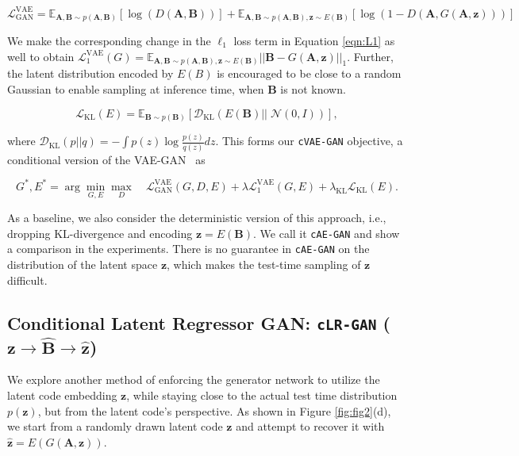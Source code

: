 \begin{equation}
\mathcal{L}_{\text{GAN}}^{\text{VAE}} = \mathds{E}_{\mathbf{A},\mathbf{B}\sim p(\mathbf{A},\mathbf{B})}[\log(D(\mathbf{A},\mathbf{B}))] + \mathds{E}_{\mathbf{A},\mathbf{B}\sim p(\mathbf{A},\mathbf{B}),\mathbf{z}\sim E(\mathbf{B})}[ \log(1-D(\mathbf{A},G(\mathbf{A},\mathbf{z})))]
\label{eqn:LVAE}
\end{equation}

We make the corresponding change in the $\ell_1$ loss term in Equation \ref{eqn:L1} as well to obtain $\mathcal{L}_1^{\text{VAE}}(G)=\mathds{E}_{\mathbf{A},\mathbf{B}\sim p(\mathbf{A},\mathbf{B}),\mathbf{z}\sim E(\mathbf{B})} ||\mathbf{B} - G(\mathbf{A},\mathbf{z}) ||_1$. Further, the latent distribution encoded by $E(B)$ is encouraged to be close to a random Gaussian to enable sampling at inference time, when $\mathbf{B}$ is not known.

\begin{equation}
\mathcal{L}_{\text{KL}}(E) = \mathds{E}_{\mathbf{B}\sim p(\mathbf{B})} [ \mathcal{D}_{\text{KL}}(E(\mathbf{B}) || \;\mathcal{N}(0,I)) ],
\label{eqn:KL}
\end{equation}

where $\mathcal{D}_{\text{KL}}(p||q)=-\int  p(z) \log\frac{p(z)}{q(z)}dz $. This forms our \texttt{cVAE-GAN} objective, a conditional version of the VAE-GAN~\citep{larsen2016vaegan} as

\begin{equation}
G^{*}, E^{*} = \arg\min_{G,E} \max_{D}  \quad \mathcal{L}_{\text{GAN}}^{\text{VAE}}(G,D,E)
+ \lambda\mathcal{L}_1^{\text{VAE}}(G, E)+\lambda_{\text{KL}}\mathcal{L}_{\text{KL}}(E).
\end{equation}

As a baseline, we also consider the deterministic version of this approach, i.e., dropping KL-divergence and encoding $\mathbf{z}=E(\mathbf{B})$.
We call it \texttt{cAE-GAN} and show a comparison in the experiments. There is no guarantee in \texttt{cAE-GAN} on the distribution of the latent space $\mathbf{z}$, which makes the test-time sampling of $\mathbf{z}$ difficult. 

\subsection{Conditional Latent Regressor GAN: \texttt{cLR-GAN} ($\mathbf{z} \rightarrow \widehat{\mathbf{B}} \rightarrow \widehat{\mathbf{z}}$)}
We explore another method of enforcing the generator network to utilize the latent code embedding $\mathbf{z}$, while staying close to the actual test time distribution $p(\mathbf{z})$, but from the latent code's perspective. As shown in Figure \ref{fig:fig2}(d), we start from a randomly drawn latent code $\mathbf{z}$ and attempt to recover it with $\widehat{\mathbf{z}}=E(G(\mathbf{A},\mathbf{z}))$.


